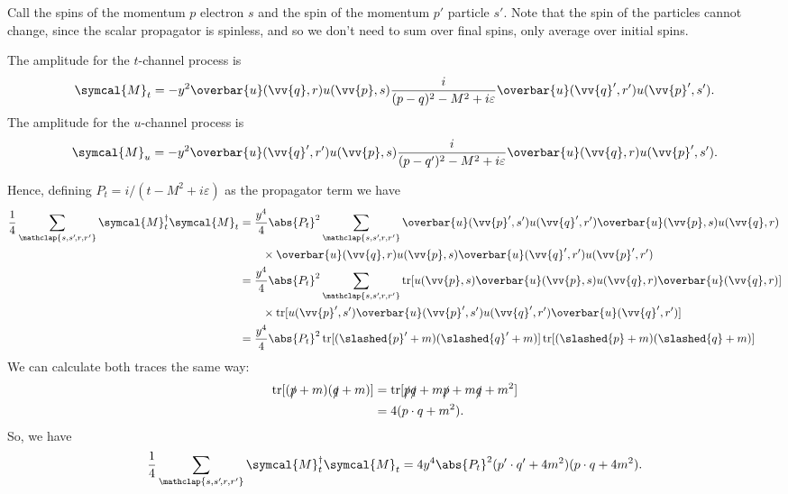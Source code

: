 \documentclass[fleqn]{NotesClass}
\newcommand{\hermit}{{\dagger}}
\newcommand{\amplitude}{\symcal{M}}
\DeclareMathOperator{\tr}{tr}
\newcommand{\diracadjoint}[1]{\overbar{#1}}
\begin{document}
    Call the spins of the momentum \(p\) electron \(s\) and the spin of the momentum \(p'\) particle \(s'\).
    Note that the spin of the particles cannot change, since the scalar propagator is spinless, and so we don't need to sum over final spins, only average over initial spins.
    
    The amplitude for the \(t\)-channel process is
    \begin{equation}
        \amplitude_t = -y^2\diracadjoint{u}(\vv{q}, r) u(\vv{p}, s) \frac{i}{(p - q)^2 - M^2 + i\varepsilon} \diracadjoint{u}(\vv{q}', r') u(\vv{p}', s').
    \end{equation}
    The amplitude for the \(u\)-channel process is
    \begin{equation}
        \amplitude_u = -y^2 \diracadjoint{u}(\vv{q}', r') u(\vv{p}, s) \frac{i}{(p - q')^2 - M^2 + i\varepsilon} \diracadjoint{u}(\vv{q}, r) u(\vv{p}', s').
    \end{equation}
    
    Hence, defining \(P_t = i/(t - M^2 + i\varepsilon)\) as the propagator term we have
    \begin{align}
        \frac{1}{4} \sum_{\mathclap{s, s'\!, r, r'}} \amplitude_t^\hermit \amplitude_t &= \frac{y^4}{4} \abs{P_t}^2 \sum_{\mathclap{s, s'\!, r, r'}} \diracadjoint{u}(\vv{p}', s') u(\vv{q}', r') \diracadjoint{u}(\vv{p}, s) u(\vv{q}, r) \notag\\
        &\qquad \times\diracadjoint{u}(\vv{q}, r) u(\vv{p}, s) \diracadjoint{u}(\vv{q}', r') u(\vv{p}', r')\\
        &= \frac{y^4}{4} \abs{P_t}^2 \sum_{\mathclap{s, s'\!, r, r'}} \tr[u(\vv{p}, s)\diracadjoint{u}(\vv{p}, s) u(\vv{q}, r) \diracadjoint{u}(\vv{q}, r)] \notag\\
        &\qquad \times\tr[u(\vv{p}', s')\diracadjoint{u}(\vv{p}', s') u(\vv{q}', r') \diracadjoint{u}(\vv{q}', r')]\\
        &= \frac{y^4}{4} \abs{P_t}^2 \tr[(\slashed{p}' + m)(\slashed{q}' + m)] \tr[(\slashed{p} + m)(\slashed{q} + m)]
    \end{align}
    We can calculate both traces the same way:
    \begin{align}
        \tr[(\slashed{p} + m)(\slashed{q} + m)] &= \tr[\slashed{p}\slashed{q} + m\slashed{p} + m\slashed{q} + m^2]\\
        &= 4(p \cdot q + m^2).
    \end{align}
    So, we have
    \begin{equation}
        \frac{1}{4}\sum_{\mathclap{s, s'\!, r, r'}} \amplitude_t^\hermit \amplitude_t = 4y^4 \abs{P_t}^2 (p' \cdot q' + 4m^2)(p \cdot q + 4m^2).
    \end{equation}
    
\end{document}
